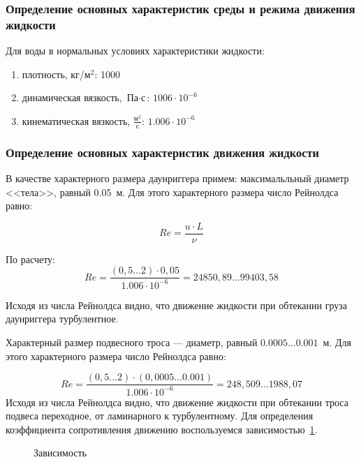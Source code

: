 \documentclass[russian,utf8, pointsubsection]{eskdtext}
\begin{document}
\subsubsection{Определение основных характеристик среды и режима движения жидкости}
Для воды в нормальных условиях характеристики жидкости:
\begin{enumerate}
\item плотность, кг/м$^2$: 1000
\item динамическая вязкость, $\text{Па}\cdot\text{с}$\cite{waterProps}: $1006\cdot10^{-6}$ 
\item кинематическая вязкость, $\frac{\text{м}^2}{\text{с}}$\cite{waterProps}: $1.006\cdot10^{-6}$
\end{enumerate}

\subsubsection{Определение основных характеристик движения жидкости}
\pointsubsubsection В качестве характерного размера даунриггера примем:
максимальльный диаметр <<тела>>, равный 0.05~м. 
Для этого характерного размера число Рейнолдса равно:

\begin{equation}
Re = \frac{u\cdot{L}}{\nu} 
\end{equation}

По расчету:
\begin{equation}
Re = \frac{(0,5\dots2)\cdot{0,05}}{1.006\cdot10^{-6}}=24850,89\dots99403,58
\end{equation}

Исходя из числа Рейнолдса видно, что движение жидкости при обтекании груза даунриггера турбулентное.

Характерный размер подвесного троса --- диаметр, равный $0.0005\dots0.001$~м. Для этого характерного размера число Рейнолдса равно:

\begin{equation}
Re = \frac{(0,5\dots2)\cdot{(0,0005\dots0.001)}}{1.006\cdot10^{-6}}=248,509\dots1988,07
\end{equation}
\pointsubsubsection Исходя из числа Рейнолдса видно, что движение жидкости при обтекании троса подвеса переходное, от ламинарного к турбулентному. Для определения коэффициента сопротивления движению воспользуемся зависимостью~\ref{ris:grsphCd}.

\begin{figure}[h]
\caption{Зависимость}\label{ris:grsphCd}
\end{figure}



\end{document}
